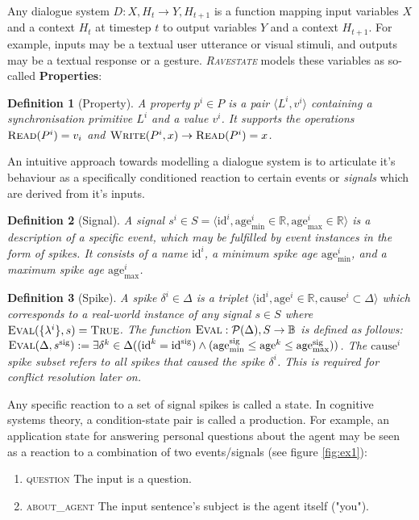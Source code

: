 \documentclass{article}
\newcommand{\rasta}{\textit{\textsc{Ravestate}}\xspace}
\newcommand{\mathsc}[1]{\text{\textsc{#1}}}
\newtheorem{definition}{Definition}
\begin{document}
\begin{multicols}{2}
Any dialogue system $D: X,H_t \rightarrow Y,H_{t+1}$ is a function mapping input variables $X$ and a context $H_t$ at timestep $t$ to output variables $Y$ and a context $H_{t+1}$. For example, inputs may be a textual user utterance or visual stimuli, and outputs may be a textual response or a gesture. \rasta models these variables as so-called \textbf{Properties}:

\begin{definition}[Property]
A property $p^i \in P$ is a pair $\langle L^i, v^i \rangle$ containing a synchronisation primitive $L^i$ and a value $v^i$. It supports the operations $\mathsc{Read}(P^i) = v_i$ and $\mathsc{Write}(P^i, x) \rightarrow \mathsc{Read}(P^i) = x$.
\end{definition}

An intuitive approach towards modelling a dialogue system is to articulate it's behaviour as a specifically conditioned reaction to certain events or \textit{signals} which are derived from it's inputs.

\begin{definition}[Signal]
A signal $s^i \in S = \langle \text{id}^i, \text{age}^i_\text{min} \in \mathbb{R}, \text{age}^i_\text{max} \in \mathbb{R} \rangle$ is a description of a specific event, which may be fulfilled by event instances in the form of \textit{spikes}. It consists of a name $\text{id}^i$, a minimum spike age $\text{age}^i_\text{min}$, and a maximum spike age $\text{age}^i_\text{max}$.
\end{definition}

\begin{definition}[Spike]
A spike $\delta^i \in \Delta$ is a triplet $\langle \text{id}^i, \text{age}^i \in \mathbb{R}, \text{cause}^i \subset \Delta \rangle$ which corresponds to a real-world instance of any signal $s \in S$ where $\mathsc{Eval}(\{\lambda^i\}, s) = \mathsc{True}$. The function $\mathsc{Eval}: \mathcal{P}(\Delta), S \rightarrow \mathbb{B}$ is defined as follows: $\mathsc{Eval}(\Delta, s^\text{sig}) := \exists \delta^k \in \Delta ( (\text{id}^k = \text{id}^\text{sig}) \land (\text{age}^\text{sig}_\text{min} \leq \text{age}^k \leq \text{age}^\text{sig}_\text{max}) )$. The $\text{cause}^i$ spike subset refers to all spikes that caused the spike $\delta^i$. This is required for conflict resolution later on.
\end{definition}

Any specific reaction to a set of signal spikes is called a state. In cognitive systems theory, a condition-state pair is called a production. For example, an application state for answering personal questions about the agent may be seen as a reaction to a combination of two events/signals (see figure \ref{fig:ex1}):
\begin{enumerate}
    \item \textsc{question} The input is a question.
    \item \textsc{about\_agent} The input sentence's subject is the agent itself ("you").
\end{enumerate}


\end{multicols}
\end{document}
